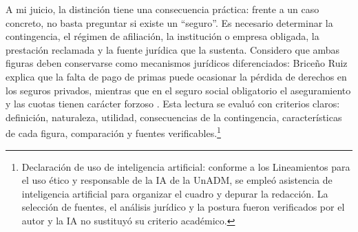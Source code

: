 \documentclass[12pt,letterpaper,oneside]{article}
\begin{document}
A mi juicio, la distinci\'on tiene una consecuencia pr\'actica: frente a un caso concreto, no basta preguntar si existe un ``seguro''. Es necesario determinar la contingencia, el r\'egimen de afiliaci\'on, la instituci\'on o empresa obligada, la prestaci\'on reclamada y la fuente jur\'idica que la sustenta. Considero que ambas figuras deben conservarse como mecanismos jur\'idicos diferenciados: Brice\~no Ruiz explica que la falta de pago de primas puede ocasionar la p\'erdida de derechos en los seguros privados, mientras que en el seguro social obligatorio el aseguramiento y las cuotas tienen car\'acter forzoso \citep{bricenoRuiz2011}. Esta lectura se evalu\'o con criterios claros: definici\'on, naturaleza, utilidad, consecuencias de la contingencia, caracter\'isticas de cada figura, comparaci\'on y fuentes verificables.\footnote{Declaraci\'on de uso de inteligencia artificial: conforme a los Lineamientos para el uso \'etico y responsable de la IA de la UnADM, se emple\'o asistencia de inteligencia artificial para organizar el cuadro y depurar la redacci\'on. La selecci\'on de fuentes, el an\'alisis jur\'idico y la postura fueron verificados por el autor y la IA no sustituy\'o su criterio acad\'emico.}

\clearpage
\nocite{bricenoRuiz2011,belmontParra2017,perezSotoCalderon2012,lss2026,leyContratoSeguro2026,idcRodriguez2019}

\end{document}
